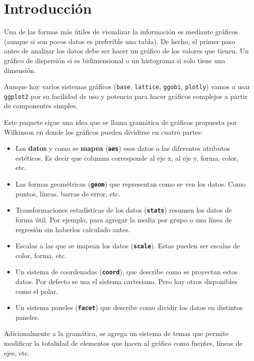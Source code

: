 \documentclass[]{book}
\providecommand{\tightlist}{%
  \setlength{\itemsep}{0pt}\setlength{\parskip}{0pt}}
\theoremstyle{definition}
\theoremstyle{definition}
\theoremstyle{definition}
\theoremstyle{remark}
\begin{document}
\hypertarget{introduccion}{%
\section{Introducción}\label{introduccion}}

Una de las formas más útiles de visualizar la información es mediante
gráficos (aunque si son pocos datos es preferible una tabla). De hecho,
el primer paso antes de analizar los datos debe ser hacer un gráfico de
los valores que tienen. Un gráfico de dispersión si es bidimensional o
un histograma si solo tiene una dimensión.

Aunque hay varios sistemas gráficos (\texttt{base}, \texttt{lattice},
\texttt{ggobi}, \texttt{plotly}) vamos a usar \texttt{ggplot2} por su
facilidad de uso y potencia para hacer gráficos complejos a partir de
componentes simples.

Este paquete sigue una idea que se llama gramática de gráficos propuesta
por Wilkinson en donde los gráficos pueden dividirse en cuatro partes:

\begin{itemize}
\tightlist
\item
  Los \textbf{datos} y como se \textbf{mapea} (\textbf{\texttt{aes}})
  esos datos a las diferentes atributos estéticos. Es decir que columna
  corresponde al eje x, al eje y, forma, color, etc.
\item
  Las formas geométricas (\textbf{\texttt{geom}}) que representan como
  se ven los datos. Como puntos, líneas, barras de error, etc.
\item
  Transformaciones estadísticas de los datos (\textbf{\texttt{stats}})
  resumen los datos de forma útil. Por ejemplo, para agregar la media
  por grupo o una línea de regresión sin haberlos calculado antes.
\item
  Escalas a las que se mapean los datos (\textbf{\texttt{scale}}). Estas
  pueden ser escalas de color, forma, etc.
\item
  Un sistema de coordenadas (\textbf{\texttt{coord}}), que describe como
  se proyectan estos datos. Por defecto se usa el sistema cartesiano.
  Pero hay otros disponibles como el polar.
\item
  Un sistema paneles (\textbf{\texttt{facet}}) que describe como dividir
  los datos en distintos paneles.
\end{itemize}

Adicionalmente a la gramática, se agrega un sistema de temas que permite
modificar la totalidad de elementos que hacen al gráfico como fuentes,
líneas de ejes, etc.
\end{document}
